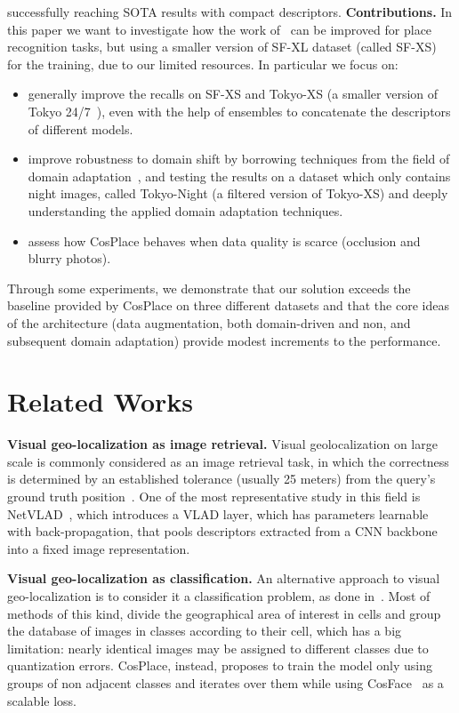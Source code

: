 \documentclass[10pt,twocolumn,letterpaper]{article}
\begin{document}
successfully reaching SOTA results with compact descriptors.
\newline
\textbf{Contributions.}
In this paper we want to investigate how the work of~\cite{Berton_CVPR_2022_CosPlace} can be improved for place recognition tasks, but using a smaller version of SF-XL dataset (called SF-XS) for the training, due to our limited resources.
In particular we focus on:
\begin{itemize}
    \item generally improve the recalls on SF-XS and Tokyo-XS (a smaller version of Tokyo 24/7~\cite{tokyo247}), even with the help of ensembles to concatenate the descriptors of different models.
    \item improve robustness to domain shift by borrowing techniques from the field of domain adaptation~\cite{adageo}, and testing the results on a dataset which only contains night images, called Tokyo-Night (a filtered version of Tokyo-XS) and deeply understanding the applied domain adaptation techniques.
    \item assess how CosPlace behaves when data quality is scarce (\eg occlusion and blurry photos). 
\end{itemize} 

Through some experiments, we demonstrate that our solution exceeds the baseline provided by CosPlace on three different datasets and that the core ideas of the architecture (data augmentation, both domain-driven and non, and subsequent domain adaptation) provide modest increments to the performance.

\section{Related Works}\label{sec:relatedworks}
\textbf{Visual geo-localization as image retrieval.} Visual geolocalization on large scale is commonly considered as an image retrieval task, in which the correctness is determined by an established
tolerance (usually 25 meters) from the query's ground truth position~\cite{netvlad, adageo}.    
One of the most representative study in this field is NetVLAD~\cite{netvlad}, which introduces a VLAD layer, which has parameters learnable with back-propagation, that pools descriptors extracted from a CNN backbone into a fixed image representation.
\newline

\textbf{Visual geo-localization as classification.}
An alternative approach to visual geo-localization is to consider it a classification problem, as done in~\cite{Berton_CVPR_2022_CosPlace}. Most of methods of this kind, divide the geographical area of interest in cells and group the database of images in classes according to their cell, which has a big limitation: nearly identical images may be assigned to different classes due to quantization errors.
CosPlace, instead, proposes to train the model only using groups of non adjacent classes and iterates over them while using CosFace~\cite{cosface} as a scalable loss.
\newline
\end{document}
